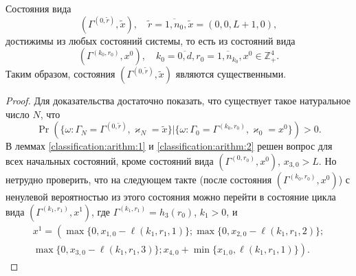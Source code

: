 \begin{lemma}\label{all:in:one}
Состояния вида 
$$(\Gamma^{(0,  \tilde{r})},  \tilde{x}),  \quad \tilde{r} = \overline{1,  n_0},  \tilde{x}=(0,  0,  L+1,  0), $$
достижимы из любых состояний системы,  то есть из состояний вида 
 $$(\Gamma^{(k_0,  r_0)},  x^0),  \quad k_0=\overline{0,  d},  r_0=\overline{1,  n_{k_0}},  x^0 \in \mathbb{Z}_+^4.$$
Таким образом,  состояния $(\Gamma^{(0,  \tilde{r})},  \tilde{x})$ являются существенными.
\label{first:lemma}
\end{lemma}
\begin{proof}
Для доказательства достаточно показать,  что существует такое натуральное число $N$,  что 
\begin{equation*}
\Pr(\{\omega\colon \Gamma_{N}=\Gamma^{(0,  \tilde{r} )},  \varkappa_{N}=\tilde{x}\}|
\{\omega\colon \Gamma_{0}=\Gamma^{(k_0,  r_0)},  \varkappa_{0}=x^0\})>0.
\end{equation*}
В леммах \eqref{classification:arithm:1} и \eqref{classification:arithm:2} решен вопрос для всех начальных состояний,  кроме состояний вида $(\Gamma^{(0,  r_0)},  x^0)$,  $x_{3,  0}>L$. Но нетрудно проверить,  что на следующем такте (после состояния $(\Gamma^{(k_0,  r_0)},  x^0)$) с ненулевой вероятностью из этого состояния можно перейти в состояние цикла вида $(\Gamma^{(k_1,  r_1)}, x^1)$,  где $\Gamma^{(k_1,  r_1)} = h_3(r_0)$,  $k_1>0$,  и 
\begin{multline*}
x^{1}=\left(\max{\{0,  x_{1, 0} - \ell(k_1,  r_1, 1)\}};
\max{\{0,  x_{2, 0} - \ell(k_1,  r_1,  2)\}};\right.\\
\left.
\max{\{0,  x_{3,  0} - \ell(k_1,  r_1,  3)\}};
x_{4,  0} + \min{\{x_{1,  0},  \ell(k_1,  r_1,  1)\}}\right).
\end{multline*}



\end{proof}
